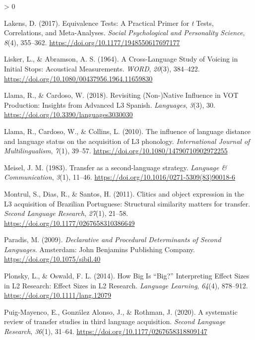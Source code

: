 \documentclass[
  english,
  man]{apa6}
\newlength{\cslhangindent}
\newenvironment{CSLReferences}[2] %
 {%
  \setlength{\parindent}{0pt}
  \ifodd #1 \everypar{\setlength{\hangindent}{\cslhangindent}}\ignorespaces\fi
  \ifnum #2 > 0
  \setlength{\parskip}{#2\baselineskip}
  \fi
 }%
 {}
\begin{document}
\begin{CSLReferences}{1}{0}
\leavevmode\hypertarget{ref-lakens_equivalence_2017}{}%
Lakens, D. (2017). Equivalence {Tests}: {A} {Practical} {Primer} for \emph{t} {Tests}, {Correlations}, and {Meta}-{Analyses}. \emph{Social Psychological and Personality Science}, \emph{8}(4), 355--362. \url{https://doi.org/10.1177/1948550617697177}

\leavevmode\hypertarget{ref-lisker_cross-language_1964}{}%
Lisker, L., \& Abramson, A. S. (1964). A {Cross}-{Language} {Study} of {Voicing} in {Initial} {Stops}: {Acoustical} {Measurements}. \emph{\emph{WORD}}, \emph{20}(3), 384--422. \url{https://doi.org/10.1080/00437956.1964.11659830}

\leavevmode\hypertarget{ref-llama_revisiting_2018}{}%
Llama, R., \& Cardoso, W. (2018). Revisiting ({Non}-){Native} {Influence} in {VOT} {Production}: {Insights} from {Advanced} {L3} {Spanish}. \emph{Languages}, \emph{3}(3), 30. \url{https://doi.org/10.3390/languages3030030}

\leavevmode\hypertarget{ref-llama_influence_2010}{}%
Llama, R., Cardoso, W., \& Collins, L. (2010). The influence of language distance and language status on the acquisition of {L3} phonology. \emph{International Journal of Multilingualism}, \emph{7}(1), 39--57. \url{https://doi.org/10.1080/14790710902972255}

\leavevmode\hypertarget{ref-meisel_transfer_1983}{}%
Meisel, J. M. (1983). Transfer as a second-language strategy. \emph{Language \& Communication}, \emph{3}(1), 11--46. \url{https://doi.org/10.1016/0271-5309(83)90018-6}

\leavevmode\hypertarget{ref-montrul_clitics_2011}{}%
Montrul, S., Dias, R., \& Santos, H. (2011). Clitics and object expression in the {L3} acquisition of {Brazilian} {Portuguese}: {Structural} similarity matters for transfer. \emph{Second Language Research}, \emph{27}(1), 21--58. \url{https://doi.org/10.1177/0267658310386649}

\leavevmode\hypertarget{ref-paradis_declarative_2009}{}%
Paradis, M. (2009). \emph{Declarative and {Procedural} {Determinants} of {Second} {Languages}}. Amsterdam: John Benjamins Publishing Company. \url{https://doi.org/10.1075/sibil.40}

\leavevmode\hypertarget{ref-plonsky_how_2014}{}%
Plonsky, L., \& Oswald, F. L. (2014). How {Big} {Is} {``{Big}?''} {Interpreting} {Effect} {Sizes} in {L2} {Research}: {Effect} {Sizes} in {L2} {Research}. \emph{Language Learning}, \emph{64}(4), 878--912. \url{https://doi.org/10.1111/lang.12079}

\leavevmode\hypertarget{ref-puig-mayenco_systematic_2020}{}%
Puig-Mayenco, E., González Alonso, J., \& Rothman, J. (2020). A systematic review of transfer studies in third language acquisition. \emph{Second Language Research}, \emph{36}(1), 31--64. \url{https://doi.org/10.1177/0267658318809147}


\end{CSLReferences}
\end{document}
